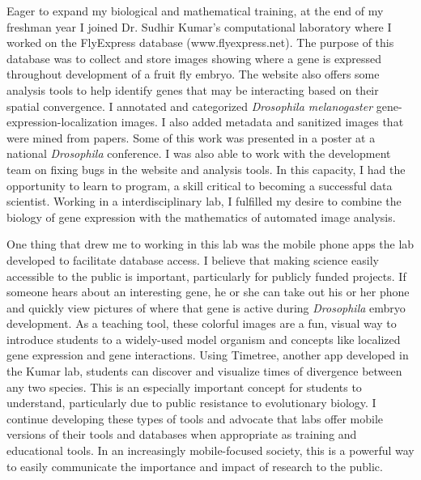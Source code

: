 \documentclass[12pt]{article}
\begin{document}
Eager to expand my biological and mathematical training, at the end of my freshman year I joined Dr. Sudhir Kumar's computational laboratory where I worked on the FlyExpress database (www.flyexpress.net). The purpose of this database was to collect and store images showing where a gene is expressed throughout development of a fruit fly embryo. The website also offers some analysis tools to help identify genes that may be interacting based on their spatial convergence.
I annotated and categorized \textit{Drosophila melanogaster} gene-expression-localization images. I also added metadata and sanitized images that were mined from papers. Some of this work was presented in a poster at a national \textit{Drosophila} conference. I was also able to work with the development team on fixing bugs in the website and analysis tools. In this capacity, I had the opportunity to learn to program, a skill critical to becoming a successful data scientist. Working in a interdisciplinary lab, I fulfilled my desire to combine the biology of gene expression with the mathematics of automated image analysis.

One thing that drew me to working in this lab was the mobile phone apps the lab developed to facilitate database access. I believe that making science easily accessible to the public is important, particularly for publicly funded projects. If someone hears about an interesting gene, he or she can take out his or her phone and quickly view pictures of where that gene is active during \textit{Drosophila} embryo development. As a teaching tool, these colorful images are a fun, visual way to introduce students to a widely-used model organism and concepts like localized gene expression and gene interactions. Using Timetree, another app developed in the Kumar lab, students can discover and visualize times of divergence between any two species. This is an especially important concept for students to understand, particularly due to public resistance to evolutionary biology. I continue developing these types of tools and advocate that labs offer mobile versions of their tools and databases when appropriate as training and educational tools. In an increasingly mobile-focused society, this is a powerful way to easily communicate the importance and impact of research to the public.
\end{document}

